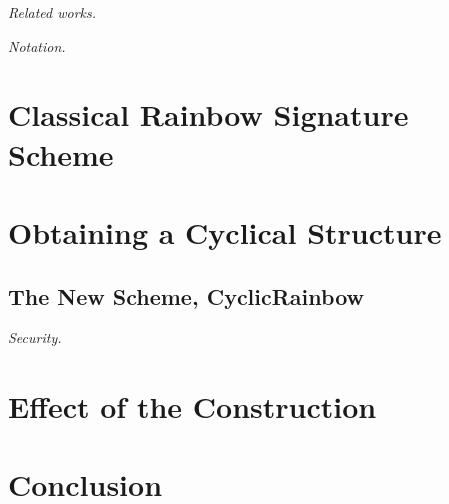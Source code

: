 \documentclass[a4paper, 14pt]{extarticle}
\begin{document}
\emph{Related works.}

\emph{Notation.}

\section{Classical Rainbow Signature Scheme}

\section{Obtaining a Cyclical Structure}

\subsection{The New Scheme, CyclicRainbow}

\emph{Security.}

\section{Effect of the Construction}

\section{Conclusion}


{\small
}
\end{document}
